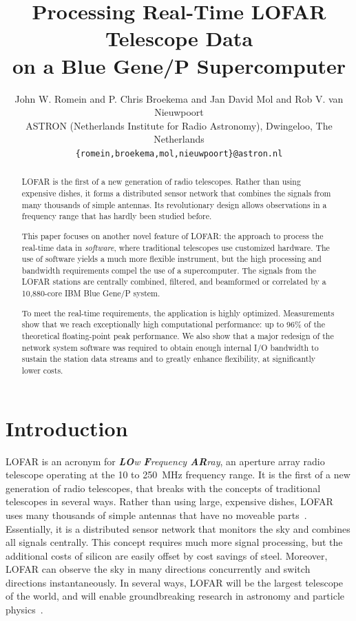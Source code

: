 \documentclass[10pt]{article}
\begin{document}
\title{Processing Real-Time LOFAR Telescope Data \\ on a Blue Gene/P Supercomputer}
\author{John W. Romein and P. Chris Broekema and Jan David Mol and Rob V. van Nieuwpoort\\
ASTRON (Netherlands Institute for Radio Astronomy), Dwingeloo, The Netherlands\\
\small{\texttt{\{romein,broekema,mol,nieuwpoort\}@astron.nl}}}

\date{}

\maketitle


\begin{abstract}
LOFAR is the first of a new generation of radio telescopes.
Rather than using expensive dishes, it forms a distributed sensor network that
combines the signals from many thousands of simple antennas.
Its revolutionary design allows observations in a frequency range that has
hardly been studied before.

This paper focuses on another novel feature of LOFAR: the approach to
process the real-time data in \emph{software}, where traditional telescopes
use customized hardware.
The use of software yields a much more flexible instrument, but the high
processing and bandwidth requirements compel the use of a supercomputer.
The signals from the LOFAR stations are centrally combined, filtered, and
beamformed or correlated by a 10,880-core IBM Blue Gene/P system.

To meet the real-time requirements, the application is highly optimized.
Measurements show that we reach exceptionally high computational performance:
up to 96\% of the theoretical floating-point peak performance.
We also show that a major redesign of the network system software was
required to obtain enough internal I/O bandwidth to sustain the station data
streams and to greatly enhance flexibility, at significantly lower costs.
\end{abstract}


\section{Introduction}
LOFAR is an acronym for \emph{\textbf{LO}w \textbf{F}requency \textbf{AR}ray},
an aperture array radio telescope operating at the 10 to 250~MHz frequency
range.
It is the first of a new generation of radio telescopes, that breaks with
the concepts of traditional telescopes in several ways.
Rather than using large, expensive dishes, LOFAR uses many thousands of
simple antennas that have no moveable parts~\cite{Butcher:04,deVos:09}.
Essentially, it is a distributed sensor network that monitors the sky
and combines all signals centrally.
This concept requires much more signal processing, but the additional costs
of silicon are easily offset by cost savings of steel.
Moreover, LOFAR can observe the sky in many directions concurrently and
switch directions instantaneously.
In several ways, LOFAR will be the largest telescope of the world, and will
enable groundbreaking research in astronomy and particle
physics~\cite{Bruyn:02}.
\end{document}
